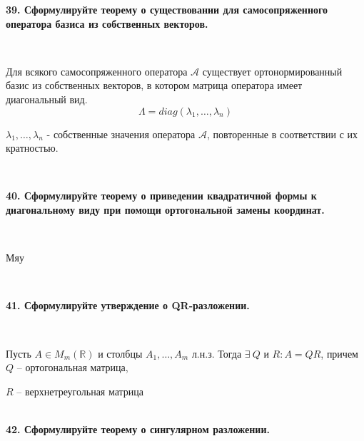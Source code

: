 \documentclass{article}
\begin{document}
    \textbf{39. Сформулируйте теорему о существовании для самосопряженного оператора базиса из собственных векторов.}

    {
        $\;$
        \setlength{\parindent}{0.4cm}
        \hangindent=0.4cm

    Для всякого самосопряженного оператора $\mathcal{A}$ существует ортонормированный базис из собственных векторов, в котором матрица оператора имеет диагональный вид.
        $$\Lambda=diag(\lambda_1,\dots,\lambda_n)$$


        $\lambda_1,\dots,\lambda_n$ - собственные значения оператора $\mathcal{A}$, повторенные в соответствии с их кратностью.

        $\;$
        \setlength{\parindent}{0cm}
        \hangindent=0cm
    }

    \textbf{}

    \textbf{40. Сформулируйте теорему о приведении квадратичной формы к диагональному виду при помощи ортогональной замены координат.}

    {
        $\;$
        \setlength{\parindent}{0.4cm}
        \hangindent=0.4cm

        Мяу

        $\;$
        \setlength{\parindent}{0cm}
        \hangindent=0cm
    }


    \textbf{41. Сформулируйте утверждение о QR-разложении.}

    {
        $\;$
        \setlength{\parindent}{0.4cm}
        \hangindent=0.4cm

    Пусть $A\in M_m(\mathbb{R})$ и столбцы $A_1, \ldots, A_m$ л.н.з. Тогда $\exists\ Q$ и $R:A=QR$, причем $Q$ -- ортогональная матрица,

        $R$ -- верхнетреугольная матрица\\

        $\;$
        \setlength{\parindent}{0cm}
        \hangindent=0cm
    }


    \textbf{42. Сформулируйте теорему о сингулярном разложении.}
\end{document}
